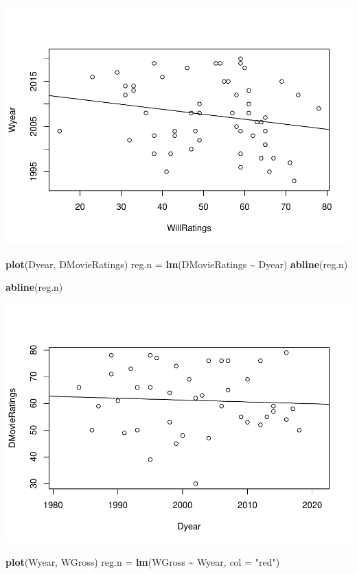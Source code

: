 \documentclass[]{article}
\newenvironment{Shaded}{\begin{snugshade}}{\end{snugshade}}
\newcommand{\DataTypeTok}[1]{\textcolor[rgb]{0.13,0.29,0.53}{#1}}
\newcommand{\KeywordTok}[1]{\textcolor[rgb]{0.13,0.29,0.53}{\textbf{#1}}}
\newcommand{\NormalTok}[1]{#1}
\newcommand{\OperatorTok}[1]{\textcolor[rgb]{0.81,0.36,0.00}{\textbf{#1}}}
\newcommand{\StringTok}[1]{\textcolor[rgb]{0.31,0.60,0.02}{#1}}
\begin{document}
\includegraphics{Denzel-v-Will-data_files/figure-latex/unnamed-chunk-5-5.pdf}

\begin{Shaded}
\begin{Highlighting}[]
\KeywordTok{plot}\NormalTok{(Dyear, DMovieRatings)}
\NormalTok{reg.n =}\StringTok{ }\KeywordTok{lm}\NormalTok{(DMovieRatings }\OperatorTok{\textasciitilde{}}\StringTok{ }\NormalTok{Dyear)}
\KeywordTok{abline}\NormalTok{(reg.n)}

\KeywordTok{abline}\NormalTok{(reg.n)}
\end{Highlighting}
\end{Shaded}

\includegraphics{Denzel-v-Will-data_files/figure-latex/unnamed-chunk-5-6.pdf}

\begin{Shaded}
\begin{Highlighting}[]
\KeywordTok{plot}\NormalTok{(Wyear, WGross)}
\NormalTok{reg.n =}\StringTok{ }\KeywordTok{lm}\NormalTok{(WGross }\OperatorTok{\textasciitilde{}}\StringTok{ }\NormalTok{Wyear, }\DataTypeTok{col =} \StringTok{"red"}\NormalTok{)}
\end{Highlighting}
\end{Shaded}
\end{document}

